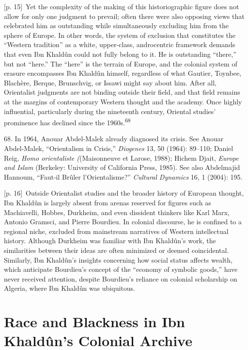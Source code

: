 \documentclass[10pt,a4paper]{article}
\begin{document}
{\scriptsize\color{gray} [p. 15]}\ Yet the complexity of the making of this historiographic figure does not allow for only one judgment to prevail; often there were also opposing views that celebrated him as outstanding while simultaneously excluding him from the sphere of Europe. In other words, the system of exclusion that constitutes the “Western tradition” as a white, upper-class, androcentric framework demands that even Ibn Khaldûn could not fully belong to it. He is outstanding “there,” but not “here.” The “here” is the terrain of Europe, and the colonial system of erasure encompasses Ibn Khaldûn himself, regardless of what Gautier, Toynbee, Blachère, Berque, Brunschvig, or Issawi might say about him. After all, Orientalist judgments are not binding outside their field, and that field remains at the margins of contemporary Western thought and the academy. Once highly influential, particularly during the nineteenth century, Oriental studies’ prominence has declined since the 1960s.\nobreak\textsuperscript{68}\par{\small 68. In 1964, Anouar Abdel‑Malek already diagnosed its crisis. See Anouar Abdel‑Malek, “Orientalism in Crisis,” \textit{Diogenes} 13, 50 (1964): 89–110; Daniel Reig, \textit{Homo orientaliste (}(Maisonneuve et Larose, 1988); Hichem Djait, \textit{Europe and Islam} (Berkeley: University of California Press, 1985). See also Abdelmajid Hannoum, “Faut‑il Brûler l’Orientalisme?” \textit{Cultural Dynamics} 16, 1 (2004): 195.\par}
{\scriptsize\color{gray} [p. 16]}\ Outside Orientalist studies and the broader history of European thought, Ibn Khaldûn is largely absent from arenas reserved for figures such as Machiavelli, Hobbes, Durkheim, and even dissident thinkers like Karl Marx, Antonio Gramsci, and Pierre Bourdieu. In colonial discourse, he is confined to a regional niche, excluded from mainstream narratives of Western intellectual history. Although Durkheim was familiar with Ibn Khaldûn’s work, the similarities between their ideas are often minimized or deemed coincidental. Similarly, Ibn Khaldûn’s insights concerning how social status affects wealth, which anticipate Bourdieu’s concept of the “economy of symbolic goods,” have never received attention, despite Bourdieu’s reliance on colonial scholarship on Algeria, where Ibn Khaldûn was ubiquitous.\par
{}\section*{Race and Blackness in Ibn Khaldûn’s Colonial Archive}
\end{document}
